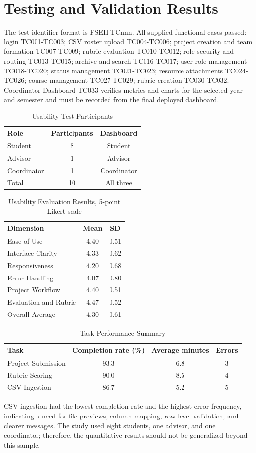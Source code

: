\documentclass[12pt,a4paper]{report}
\begin{document}
\clearpage\section{Testing and Validation Results}
The test identifier format is FSEH-TCnnn. All supplied functional cases passed: login TC001-TC003; CSV roster upload TC004-TC006; project creation and team formation TC007-TC009; rubric evaluation TC010-TC012; role security and routing TC013-TC015; archive and search TC016-TC017; user role management TC018-TC020; status management TC021-TC023; resource attachments TC024-TC026; course management TC027-TC029; rubric creation TC030-TC032. Coordinator Dashboard TC033 verifies metrics and charts for the selected year and semester and must be recorded from the final deployed dashboard.
\begin{table}[H]\centering\caption{Usability Test Participants}\begin{tabular}{lcc}\toprule Role&Participants&Dashboard\\\midrule Student&8&Student\\Advisor&1&Advisor\\Coordinator&1&Coordinator\\Total&10&All three\\\bottomrule\end{tabular}\end{table}
\begin{table}[H]\centering\caption{Usability Evaluation Results, 5-point Likert scale}\begin{tabular}{lcc}\toprule Dimension&Mean&SD\\\midrule Ease of Use&4.40&0.51\\Interface Clarity&4.33&0.62\\Responsiveness&4.20&0.68\\Error Handling&4.07&0.80\\Project Workflow&4.40&0.51\\Evaluation and Rubric&4.47&0.52\\Overall Average&4.30&0.61\\\bottomrule\end{tabular}\end{table}
\clearpage\begin{table}[H]\centering\caption{Task Performance Summary}\begin{tabular}{lccc}\toprule Task&Completion rate (\%)&Average minutes&Errors\\\midrule Project Submission&93.3&6.8&3\\Rubric Scoring&90.0&8.5&4\\CSV Ingestion&86.7&5.2&5\\\bottomrule\end{tabular}\end{table}
CSV ingestion had the lowest completion rate and the highest error frequency, indicating a need for file previews, column mapping, row-level validation, and clearer messages. The study used eight students, one advisor, and one coordinator; therefore, the quantitative results should not be generalized beyond this sample.
\end{document}
